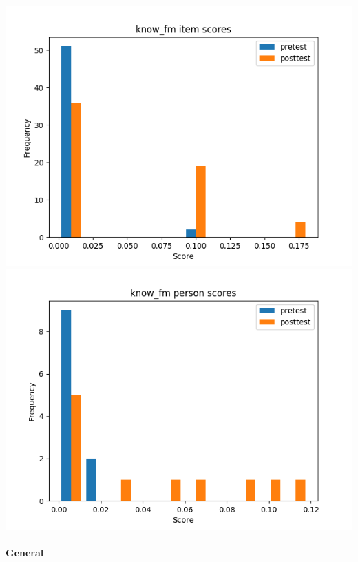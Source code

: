 \documentclass[]{article}
\begin{document}
\includegraphics{know_fm_diff.png} \includegraphics{know_fm_abil.png}

\FloatBarrier
\paragraph{General}\label{general}
\end{document}
